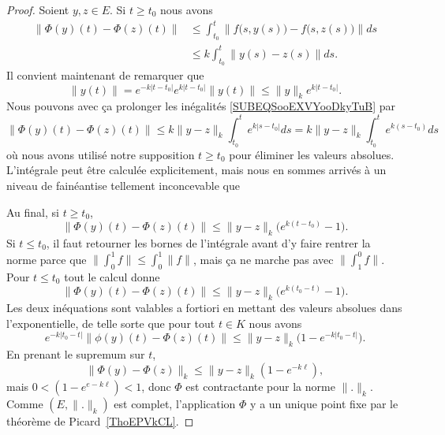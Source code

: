 \begin{proof}
	Soient \( y,z\in E\). Si \( t\geq t_0\) nous avons
	\begin{subequations}        \label{SUBEQSooEXVYooDkyTuB}
		\begin{align}
			\| \Phi(y)(t)-\Phi(z)(t) \| & \leq  \int_{t_0}^t\| f\big( s,y(s) \big)-f\big( s,z(s) \big) \|ds \\
			                            & \leq k\int_{t_0}^t\| y(s)-z(s) \|ds.
		\end{align}
	\end{subequations}
	Il convient maintenant de remarquer que
	\begin{equation}
		\| y(t) \|= e^{-k| t-t_0 |} e^{k| t-t_0 |}\| y(t) \|\leq \| y \|_k e^{k| t-t_0 |}.
	\end{equation}
	Nous pouvons avec ça prolonger les inégalités \eqref{SUBEQSooEXVYooDkyTuB} par
	\begin{equation}
		\| \Phi(y)(t)-\Phi(z)(t) \|\leq k\| y-z \|_k\int_{t_0}^t e^{k| s-t_0 |}ds=k\| y-z \|_k\int_{t_0}^t e^{k(s-t_0)}ds
	\end{equation}
	où nous avons utilisé notre supposition \( t\geq t_0\) pour éliminer les valeurs absolues. L'intégrale peut être calculée explicitement, mais nous en sommes arrivés à un niveau de fainéantise tellement inconcevable que

	

	Au final, si \( t\geq t_0\),
	\begin{equation}
		\| \Phi(y)(t)-\Phi(z)(t) \|\leq \| y-z \|_k\big(  e^{k(t-t_0)}-1 \big).
	\end{equation}
	Si \( t\leq t_0\), il faut retourner les bornes de l'intégrale avant d'y faire rentrer la norme parce que \( \| \int_0^1f \|\leq \int_0^1\| f \|\), mais ça ne marche pas avec \( \| \int_1^0f \|\). Pour \( t\leq t_0\) tout le calcul donne
	\begin{equation}
		\| \Phi(y)(t)-\Phi(z)(t) \|\leq \| y-z \|_k\big(  e^{k(t_0-t)}-1 \big).
	\end{equation}
	Les deux inéquations sont valables a fortiori en mettant des valeurs absolues dans l'exponentielle, de telle sorte que pour tout \( t\in K\) nous avons
	\begin{equation}
		e^{-k| t_0-t |}\| \phi(y)(t)-\Phi(z)(t) \|\leq \| y-z \|_k\big( 1- e^{-k| t_0-t |} \big).
	\end{equation}
	En prenant le supremum sur \( t\),
	\begin{equation}
		\| \Phi(y)-\Phi(z) \|_k\leq \| y-z \|_k(1- e^{-k\ell}),
	\end{equation}
	mais \( 0<(1- e^{e-k\ell})<1\), donc \( \Phi\) est contractante pour la norme \( \| . \|_k\). Comme \( (E,\| . \|_k)\) est complet, l'application \( \Phi\) y a un unique point fixe par le théorème de Picard~\ref{ThoEPVkCL}.


\end{proof}

